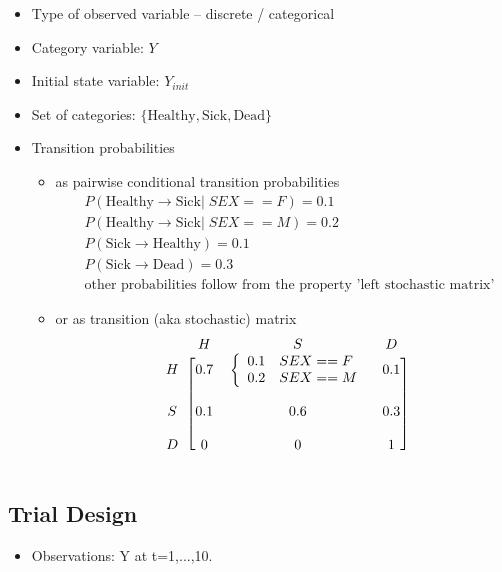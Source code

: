 \begin{itemize}
\item
Type of observed variable -- discrete / categorical
\item
Category variable: $Y$
\item
Initial state variable: $Y_{init}$
\item
Set of categories: $\{\mbox{Healthy}, \mbox{Sick}, \mbox{Dead}\}$
\item
Transition probabilities
\begin{itemize}
\item
as pairwise conditional transition probabilities
\begin{align}
& P(\mbox{Healthy} \rightarrow \mbox{Sick} | \; SEX==F) = 0.1 \nonumber \\
& P(\mbox{Healthy} \rightarrow \mbox{Sick} | \; SEX==M) = 0.2 \nonumber \\
& P(\mbox{Sick} \rightarrow \mbox{Healthy}) = 0.1 \nonumber \\
& P(\mbox{Sick} \rightarrow \mbox{Dead}) = 0.3 \nonumber \\
& \mbox{other probabilities follow from the property 'left stochastic matrix'} \nonumber
\end{align}
\item
or as transition (aka stochastic) matrix
\[
\begin{blockarray}{cccc}
& H & S & D \\
\begin{block}{c[ccc]}
H &	0.7 & \left\{\begin{array}{ll}
      	0.1 & SEX== F \\
      	0.2 & SEX== M \\
\end{array}\right. & 0.1  \\\\
S &    0.1 & 0.6 & 0.3  \\\\
D &    0 & 0 & 1  \\
\end{block}
\end{blockarray}
\]
\end{itemize}
\end{itemize}

\subsection*{Trial Design}

\begin{itemize}
\item
Observations: Y at t=1,...,10.
\end{itemize}

